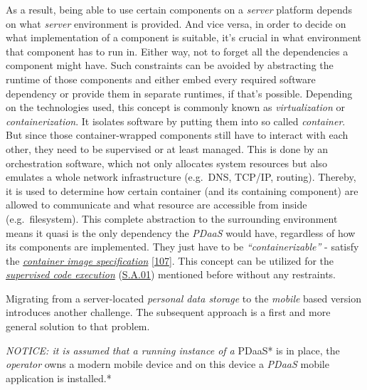 \documentclass[12pt,english,a4paper,titlepage,cleardoublepage=empty,dottedtoc]{report}
\begin{document}
As a result, being able to use certain components on a \emph{server}
platform depends on what \emph{server} environment is provided. And vice
versa, in order to decide on what implementation of a component is
suitable, it's crucial in what environment that component has to run in.
Either way, not to forget all the dependencies a component might have.
Such constraints can be avoided by abstracting the runtime of those
components and either embed every required software dependency or
provide them in separate runtimes, if that's possible. Depending on the
technologies used, this concept is commonly known as
\emph{virtualization} or \emph{containerization}. It isolates software
by putting them into so called \emph{container}. But since those
container-wrapped components still have to interact with each other,
they need to be supervised or at least managed. This is done by an
orchestration software, which not only allocates system resources but
also emulates a whole network infrastructure (e.g.~DNS, TCP/IP,
routing). Thereby, it is used to determine how certain container (and
its containing component) are allowed to communicate and what resource
are accessible from inside (e.g.~filesystem). This complete abstraction
to the surrounding environment means it quasi is the only dependency the
\emph{PDaaS} would have, regardless of how its components are
implemented. They just have to be \emph{``containerizable''} - satisfy
the \emph{\protect\hyperlink{link-container}{container image
specification}} {[}\protect\hyperlink{ref-web_oci-spec_image}{107}{]}.
This concept can be utilized for the
\emph{\protect\hyperlink{supervised-data-access}{supervised code
execution}} (\protect\hyperlink{sa01}{S.A.01}) mentioned before without
any restraints.

Migrating from a server-located \emph{personal data storage} to the
\emph{mobile} based version introduces another challenge. The subsequent
approach is a first and more general solution to that problem.

\emph{NOTICE: it is assumed that a running instance of a }PDaaS* is in
place, the \emph{operator} owns a modern mobile device and on this
device a \emph{PDaaS} mobile application is installed.*
\end{document}
